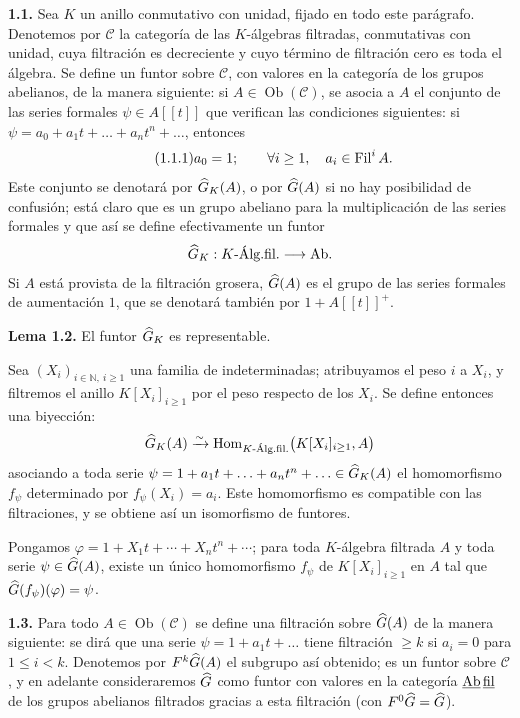 \textbf{1.1.} Sea \(K\) un anillo conmutativo con unidad, fijado en todo este parágrafo. Denotemos por \(\mathcal C\) la categoría de las \(K\)-álgebras filtradas, conmutativas con unidad, cuya filtración es decreciente y cuyo término de filtración cero es toda el álgebra. Se define un funtor sobre \(\mathcal C\), con valores en la categoría de los grupos abelianos, de la manera siguiente: si \(A\in\operatorname{Ob}(\mathcal C)\), se asocia a \(A\) el conjunto de las series formales \(\psi\in A[[t]]\) que verifican las condiciones siguientes: si \(\psi=a_0+a_1t+\ldots+a_nt^n+\ldots\), entonces
\begin{equation}\tag{1.1.1}
  a_0=1;\qquad \forall i\geq 1,\quad a_i\in\operatorname{Fil}^i A .
\end{equation}
Este conjunto se denotará por \(\widehat G_K(A)\), o por \(\widehat G(A)\) si no hay posibilidad de confusión; está claro que es un grupo abeliano para la multiplicación de las series formales y que así se define efectivamente un funtor
\[
  \widehat G_K:K\text{-Álg.fil.}\longrightarrow \mathrm{Ab}.
\]
Si \(A\) está provista de la filtración grosera, \(\widehat G(A)\) es el grupo de las series formales de aumentación \(1\), que se denotará también por \(1+A[[t]]^+\).

\textbf{Lema 1.2.} El funtor \(\widehat G_K\) es representable.

Sea \((X_i)_{i\in\mathbb N,\ i\geq 1}\) una familia de indeterminadas; atribuyamos el peso \(i\) a \(X_i\), y filtremos el anillo \(K[X_i]_{i\geq 1}\) por el peso respecto de los \(X_i\). Se define entonces una biyección:
\[
  \widehat G_K(A)\xrightarrow{\sim}
  \operatorname{Hom}_{K\text{-Álg.fil.}}\bigl(K[X_i]_{i\geq 1},A\bigr)
\]
asociando a toda serie \(\psi=1+a_1t+\ldots+a_nt^n+\ldots\in\widehat G_K(A)\) el homomorfismo \(f_\psi\) determinado por \(f_\psi(X_i)=a_i\). Este homomorfismo es compatible con las filtraciones, y se obtiene así un isomorfismo de funtores.

Pongamos \(\varphi=1+X_1t+\cdots+X_nt^n+\cdots\); para toda \(K\)-álgebra filtrada \(A\) y toda serie \(\psi\in\widehat G(A)\), existe un único homomorfismo \(f_\psi\) de \(K[X_i]_{i\geq 1}\) en \(A\) tal que \(\widehat G(f_\psi)(\varphi)=\psi\).

\textbf{1.3.} Para todo \(A\in\operatorname{Ob}(\mathcal C)\) se define una filtración sobre \(\widehat G(A)\) de la manera siguiente: se dirá que una serie \(\psi=1+a_1t+\ldots\) tiene filtración \(\geq k\) si \(a_i=0\) para \(1\leq i<k\). Denotemos por \(F^k\widehat G(A)\) el subgrupo así obtenido; es un funtor sobre \(\mathcal C\), y en adelante consideraremos \(\widehat G\) como funtor con valores en la categoría \(\underline{\mathrm{Ab}}\,\underline{\mathrm{fil}}\) de los grupos abelianos filtrados gracias a esta filtración (con \(F^0\widehat G=\widehat G\)).

